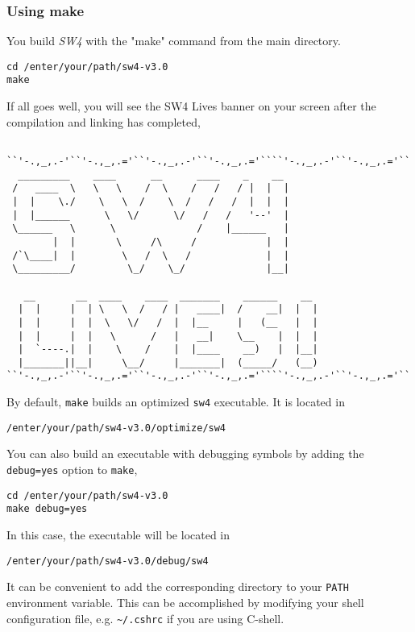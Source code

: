 \documentclass[11pt]{article}
\begin{document}
\subsubsection{Using make}
You build \emph{SW4} with the "make" command from the main directory.
\begin{verbatim}
cd /enter/your/path/sw4-v3.0
make
\end{verbatim}
If all goes well, you will see the SW4 Lives banner on your screen after the compilation and linking
has completed,
{\samepage
\begin{verbatim}
    
``'-.,_,.-'``'-.,_,.='``'-.,_,.-'``'-.,_,.='````'-.,_,.-'``'-.,_,.='``
  _________    ____      __      ____    _    __
 /   ____  \   \   \    /  \    /   /   / |  |  |  
 |  |    \./    \   \  /    \  /   /   /  |  |  |
 |  |______      \   \/      \/   /   /   '--'  |
 \______   \      \              /    |______   |
        |  |       \     /\     /            |  |      
 /`\____|  |        \   /  \   /             |  |      
 \_________/         \_/    \_/              |__|      
                                       
   __       __  ____    ____  _______    ______    __  
  |  |     |  | \   \  /   / |   ____|  /    __|  |  | 
  |  |     |  |  \   \/   /  |  |__     |   (__   |  | 
  |  |     |  |   \      /   |   __|    \__    |  |  | 
  |  `----.|  |    \    /    |  |____    __)   |  |__| 
  |_______||__|     \__/     |_______|  (_____/   (__)
``'-.,_,.-'``'-.,_,.='``'-.,_,.-'``'-.,_,.='````'-.,_,.-'``'-.,_,.='``

\end{verbatim}
}
By default, \verb+make+ builds an optimized \verb+sw4+ executable. It is located in 
\begin{verbatim}
/enter/your/path/sw4-v3.0/optimize/sw4
\end{verbatim}
You can also build an executable with debugging symbols by adding the \verb+debug=yes+ option to \verb+make+,
\begin{verbatim}
cd /enter/your/path/sw4-v3.0
make debug=yes
\end{verbatim}
In this case, the executable will be located in
\begin{verbatim}
/enter/your/path/sw4-v3.0/debug/sw4
\end{verbatim}
It can be convenient to add the corresponding directory to your \verb+PATH+ environment
variable. This can be accomplished by modifying your shell configuration file, e.g. \verb+~/.cshrc+
if you are using C-shell.
\end{document}
